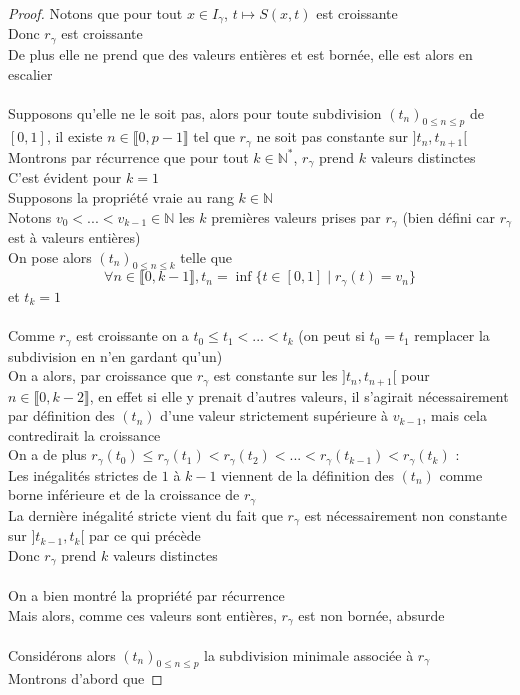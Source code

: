 \documentclass{article}
\begin{document}
\begin{flushleft}
\begin{proof}
Notons que pour tout $x \in I_{\gamma}$, $t \longmapsto S(x, t)$ est croissante\\
Donc $r_{\gamma}$ est croissante\\
De plus elle ne prend que des valeurs entières et est bornée, elle est alors en escalier
\\~\\
Supposons qu'elle ne le soit pas, alors pour toute subdivision $(t_n)_{0 \leq n \leq p}$ de $[0, 1]$, il existe
$n \in \llbracket 0, p-1 \rrbracket$ tel que $r_{\gamma}$ ne soit pas constante sur $]t_n, t_{n+1}[$\\
Montrons par récurrence que pour tout $k \in \mathbb{N}^*$, $r_{\gamma}$ prend $k$ valeurs distinctes\\
C'est évident pour $k = 1$\\
Supposons la propriété vraie au rang $k \in \mathbb{N}$\\
Notons $v_0 < ... < v_{k-1} \in \mathbb{N}$ les $k$ premières valeurs prises par $r_{\gamma}$ (bien défini car $r_{\gamma}$
est à valeurs entières)\\
On pose alors $(t_n)_{0 \leq n \leq k}$ telle que
\[ \forall n \in \llbracket 0, k-1 \rrbracket, t_n = \inf \{ t \in [0, 1] \mid r_{\gamma}(t) = v_n\} \]
et $t_k = 1$
\\~\\
Comme $r_{\gamma}$ est croissante on a $t_0 \leq t_1 < ... < t_k$ (on peut si $t_0 = t_1$ remplacer la subdivision en n'en gardant qu'un)\\
On a alors, par croissance que $r_{\gamma}$ est constante sur les $]t_n, t_{n+1}[$ pour
$n \in \llbracket 0, k-2 \rrbracket$, en effet si elle y prenait d'autres valeurs, il s'agirait nécessairement par
définition des $(t_n)$ d'une valeur strictement supérieure à $v_{k-1}$, mais cela contredirait la croissance\\
On a de plus $r_{\gamma}(t_0) \leq r_{\gamma}(t_1) < r_{\gamma}(t_2) < ... < r_{\gamma}(t_{k-1}) < r_{\gamma}(t_k)$ :\\
Les inégalités strictes de $1$ à $k-1$ viennent de la définition des $(t_n)$ comme borne inférieure et de la croissance de $r_{\gamma}$\\
La dernière inégalité stricte vient du fait que $r_{\gamma}$ est nécessairement non constante sur $]t_{k-1}, t_k[$ par ce qui précède\\
Donc $r_{\gamma}$ prend $k$ valeurs distinctes
\\~\\
On a bien montré la propriété par récurrence\\
Mais alors, comme ces valeurs sont entières, $r_{\gamma}$ est non bornée, absurde
\\~\\
Considérons alors $(t_n)_{0 \leq n \leq p}$ la subdivision minimale associée à $r_{\gamma}$\\
Montrons d'abord que


\end{proof}
\end{flushleft}
\end{document}
